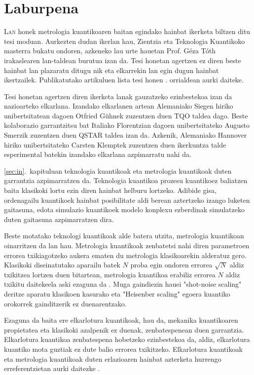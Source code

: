 \section*{Laburpena}
\label{sec:la}

\lettrine[lines=2, findent=3pt,nindent=0pt]{L}{an} honek metrologia kuantikoaren baitan egindako hainbat ikerketa biltzen ditu tesi moduan.
Aurkezten dudan ikerlan hau, Zientzia eta Teknologia Kuantikoko masterra bukatu ondoren, azkeneko lau urte hauetan Prof. Géza Tóth irakaslearen lan-taldean burutua izan da.
Tesi honetan agertzen ez diren beste hainbat lan plazaratu ditugu nik eta elkarrekin lan egin dugun hainbat ikertzailek.
Publikatutako artikuluen lista tesi honen \pageref{sec:pu}. orrialdean aurki daiteke.

Tesi honetan agertzen diren ikerketa lanak gauzatzeko ezinbestekoa izan da nazioarteko elkarlana.
Izandako elkarlanen artean Alemaniako Siegen hiriko unibertsitatean dagoen Otfried Gühnek zuzentzen duen TQO taldea dago.
Beste kolaborazio garrantzitsu bat Italiako Florentzian dagoen unibertsitateko Augusto Smerzik zuzentzen duen QSTAR taldea izan da.
Azkenik, Alemaniako Hannover hiriko unibertsitateko Carsten Klemptek zuzentzen duen ikerkuntza talde esperimental batekin izandako elkarlana azpimarratu nahi da.

\ref{sec:in}.~kapituluan teknologia kuantikoak eta metrologia kuantikoak duten garrantzia azpimarratzen da.
Teknologia kuantikoa prozesu kuantikoez baliatzen baita klasikoki lortu ezin diren hainbat helburu lortzeko.
Adibide gisa, ordenagailu kuantikoek hainbat posibilitate aldi berean aztertzeko izango luketen gaitasuna, edota simulazio kuantikoek modelo konplexu ezberdinak simulatzeko duten gaitasuna azpimarratzen dira.

Beste motatako teknologi kuantikoak alde batera utzita, metrologia kuantikoan oinarritzen da lan hau.
Metrologia kuantikoak zenbatetsi nahi diren parametroen errorea txikiagotzeko aukera ematen du metrologia klasikoarekin alderatuz gero.
Klasikoki diseinatutako aparailu batek $N$ proba egin ondoren errorea $\sqrt{N}$ aldiz txikitzea lortzen duen bitartean, metrologia kuantikoa erabiliz errorea $N$ aldiz txikitu daitekeela aski ezaguna da \cite{Giovannetti2004, Paris2009}.
Muga gaindiezin hauei "shot-noise scaling" deritze aparatu klasikoen kasurako eta "Heisenber scaling" egoera kuantiko orokorrek gainditzerik ez duenarentzako.

Ezaguna da baita ere elkarlotura kuantikoak, hau da, mekanika kuantikoaren propietatea eta klasikoki azalpenik ez duenak, zenbatespenean duen garrantzia.
Elkarlotura kuantikoa zenbatespena hobetzeko ezinbestekoa da, aldiz, elkarlotura kuantiko mota guztiak ez dute balio errorea txikitzeko.
Elkarlotura kuantikoak eta metrologia kuantikoak duten erlazioaren hainbat azterketa hurrengo erreferentzietan aurki daitezke \cite{Pezze2009, Louchet-Chauvet2010, Appel2009, Riedel2010, Gross2010, Luecke2011, Strobel2014, Hyllus2010}.

